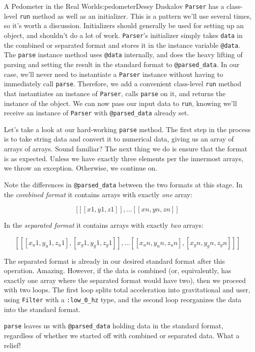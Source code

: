 \begin{aosachapter}{A Pedometer in the Real World}{s:pedometer}{Dessy Daskalov}
\texttt{Parser} has a class-level \texttt{run} method as well as an
initializer. This is a pattern we'll use several times, so it's worth a
discussion. Initializers should generally be used for setting up an
object, and shouldn't do a lot of work. \texttt{Parser}'s initializer
simply takes \texttt{data} in the combined or separated format and
stores it in the instance variable \texttt{@data}. The \texttt{parse}
instance method uses \texttt{@data} internally, and does the heavy
lifting of parsing and setting the result in the standard format to
\texttt{@parsed\_data}. In our case, we'll never need to instantiate a
\texttt{Parser} instance without having to immediately call
\texttt{parse}. Therefore, we add a convenient class-level \texttt{run}
method that instantiates an instance of \texttt{Parser}, calls
\texttt{parse} on it, and returns the instance of the object. We can now
pass our input data to \texttt{run}, knowing we'll receive an instance
of \texttt{Parser} with \texttt{@parsed\_data} already set.

Let's take a look at our hard-working \texttt{parse} method. The first
step in the process is to take string data and convert it to numerical
data, giving us an array of arrays of arrays. Sound familiar? The next
thing we do is ensure that the format is as expected. Unless we have
exactly three elements per the innermost arrays, we throw an exception.
Otherwise, we continue on.

Note the differences in \texttt{@parsed\_data} between the two formats
at this stage. In the \emph{combined format} it contains arrays with
exactly \emph{one} array:

\[[[[x1, y1, z1]], ... [[xn, yn, zn]]\]

In the \emph{separated format} it contains arrays with exactly
\emph{two} arrays:

\[[[[x_{u}1,y_{u}1,z_{u}1], [x_{g}1,y_{g}1,z_{g}1]], ... [[x_{u}n,y_{u}n,z_{u}n], [x_{g}n,y_{g}n,z_{g}n]]]\]

The separated format is already in our desired standard format after
this operation. Amazing. However, if the data is combined (or,
equivalently, has exactly one array where the separated format would
have two), then we proceed with two loops. The first loop splits total
acceleration into gravitational and user, using \texttt{Filter} with a
\texttt{:low\_0\_hz} type, and the second loop reorganizes the data into
the standard format.

\texttt{parse} leaves us with \texttt{@parsed\_data} holding data in the
standard format, regardless of whether we started off with combined or
separated data. What a relief!


\end{aosachapter}

